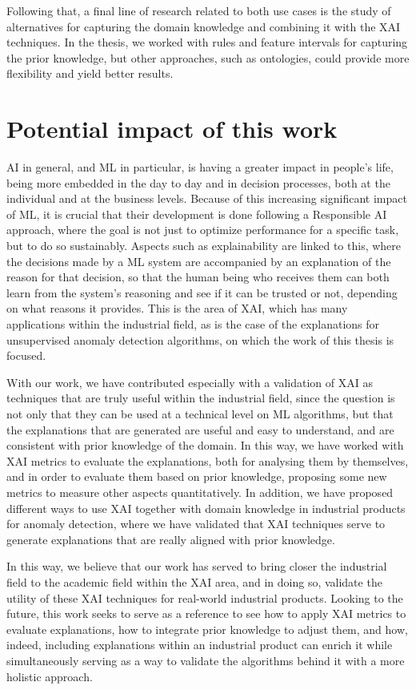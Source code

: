 Following that, a final line of research related to both use cases is the study of alternatives for capturing the domain knowledge and combining it with the XAI techniques. In the thesis, we worked with rules and feature intervals for capturing the prior knowledge, but other approaches, such as ontologies, could provide more flexibility and yield better results. 


\section{Potential impact of this work}\label{sec-conclusions-final}

AI in general, and ML in particular, is having a greater impact in people's life, being more embedded in the day to day and in decision processes, both at the individual and at the business levels. Because of this increasing significant impact of ML, it is crucial that their development is done following a Responsible AI approach, where the goal is not just to optimize performance for a specific task, but to do so sustainably. Aspects such as explainability are linked to this, where the decisions made by a ML system are accompanied by an explanation of the reason for that decision, so that the human being who receives them can both learn from the system's reasoning and see if it can be trusted or not, depending on what reasons it provides. This is the area of XAI, which has many applications within the industrial field, as is the case of the explanations for unsupervised anomaly detection algorithms, on which the work of this thesis is focused.

With our work, we have contributed especially with a validation of XAI as techniques that are truly useful within the industrial field, since the question is not only that they can be used at a technical level on ML algorithms, but that the explanations that are generated are useful and easy to understand, and are consistent with prior knowledge of the domain. In this way, we have worked with XAI metrics to evaluate the explanations, both for analysing them by themselves, and in order to evaluate them based on prior knowledge, proposing some new metrics to measure other aspects quantitatively. In addition, we have proposed different ways to use XAI together with domain knowledge in industrial products for anomaly detection, where we have validated that XAI techniques serve to generate explanations that are really aligned with prior knowledge.

In this way, we believe that our work has served to bring closer the industrial field to the academic field within the XAI area, and in doing so, validate the utility of these XAI techniques for real-world industrial products. Looking to the future, this work seeks to serve as a reference to see how to apply XAI metrics to evaluate explanations, how to integrate prior knowledge to adjust them, and how, indeed, including explanations within an industrial product can enrich it while simultaneously serving as a way to validate the algorithms behind it with a more holistic approach.

\newpage